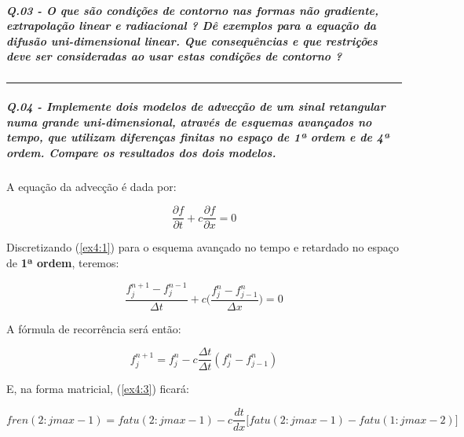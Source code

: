 \documentclass[11pt]{article}
\begin{document}
    \subparagraph{Q.03 - O que são condições de contorno nas formas não
gradiente, extrapolação linear e radiacional ? Dê exemplos para a
equação da difusão uni-dimensional linear. Que consequências e que
restrições deve ser consideradas ao usar estas condições de contorno
?}\label{q.03---o-que-suxe3o-condiuxe7uxf5es-de-contorno-nas-formas-nuxe3o-gradiente-extrapolauxe7uxe3o-linear-e-radiacional-duxea-exemplos-para-a-equauxe7uxe3o-da-difusuxe3o-uni-dimensional-linear.-que-consequuxeancias-e-que-restriuxe7uxf5es-deve-ser-consideradas-ao-usar-estas-condiuxe7uxf5es-de-contorno}

    \begin{center}\rule{0.5\linewidth}{\linethickness}\end{center}

    \subparagraph{Q.04 - Implemente dois modelos de advecção de um sinal
retangular numa grande uni-dimensional, através de esquemas avançados no
tempo, que utilizam diferenças finitas no espaço de 1ª ordem e de 4ª
ordem. Compare os resultados dos dois
modelos.}\label{q.04---implemente-dois-modelos-de-advecuxe7uxe3o-de-um-sinal-retangular-numa-grande-uni-dimensional-atravuxe9s-de-esquemas-avanuxe7ados-no-tempo-que-utilizam-diferenuxe7as-finitas-no-espauxe7o-de-1uxaa-ordem-e-de-4uxaa-ordem.-compare-os-resultados-dos-dois-modelos.}

A equação da advecção é dada por:

\begin{equation}
    \frac{\partial{f}}{\partial{t}} + c\frac{\partial{f}}{\partial{x}} = 0
    \label{ex4:1}
\end{equation}

Discretizando (\ref{ex4:1}) para o esquema avançado no tempo e retardado
no espaço de \textbf{1ª ordem}, teremos:

\begin{equation}
    \frac{f^{n+1}_{j} - f^{n-1}_{j}}{\Delta{t}} + c\Biggl( \frac{f^{n}_{j} - f^{n}_{j-1}}{\Delta{x}} \Biggl) = 0
    \label{ex4:2}
\end{equation}

A fórmula de recorrência será então:

\begin{equation}
    f^{n+1}_{j} = f^{n}_{j} - c\frac{\Delta{t}}{\Delta{t}}(f^{n}_{j} - f^{n}_{j-1})
    \label{ex4:3}
\end{equation}

E, na forma matricial, (\ref{ex4:3}) ficará:

\begin{equation}
fren(2:jmax-1) = fatu(2:jmax-1) - c\frac{dt}{dx}\biggr[ fatu(2:jmax-1) - fatu(1:jmax-2) \biggr]
\label{ex4:4}
\end{equation}
\end{document}

